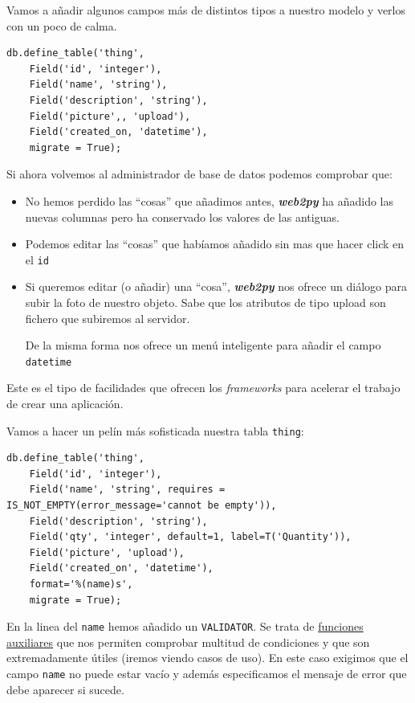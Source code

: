 \documentclass[
  12pt,
  spanish,
]{article}
\begin{document}
Vamos a añadir algunos campos más de distintos tipos a nuestro modelo y
verlos con un poco de calma.

\begin{verbatim}
db.define_table('thing',
    Field('id', 'integer'),
    Field('name', 'string'),
    Field('description', 'string'),
    Field('picture',, 'upload'),
    Field('created_on, 'datetime'),
    migrate = True);
\end{verbatim}

Si ahora volvemos al administrador de base de datos podemos comprobar
que:

\begin{itemize}
\item
  No hemos perdido las ``cosas'' que añadimos antes,
  \textbf{\emph{web2py}} ha añadido las nuevas columnas pero ha
  conservado los valores de las antiguas.
\item
  Podemos editar las ``cosas'' que habíamos añadido sin mas que hacer
  click en el \texttt{id}
\item
  Si queremos editar (o añadir) una ``cosa'', \textbf{\emph{web2py}} nos
  ofrece un diálogo para subir la foto de nuestro objeto. Sabe que los
  atributos de tipo upload son fichero que subiremos al servidor.

  De la misma forma nos ofrece un menú inteligente para añadir el campo
  \texttt{datetime}
\end{itemize}

Este es el tipo de facilidades que ofrecen los \emph{frameworks} para
acelerar el trabajo de crear una aplicación.

Vamos a hacer un pelín más sofisticada nuestra tabla \texttt{thing}:

\begin{verbatim}
db.define_table('thing',
    Field('id', 'integer'),
    Field('name', 'string', requires = IS_NOT_EMPTY(error_message='cannot be empty')),
    Field('description', 'string'),
    Field('qty', 'integer', default=1, label=T('Quantity')),
    Field('picture', 'upload'),
    Field('created_on', 'datetime'),
    format='%(name)s',
    migrate = True);
\end{verbatim}

En la linea del \texttt{name} hemos añadido un \texttt{VALIDATOR}. Se
trata de
\href{http://web2py.com/books/default/chapter/29/07/forms-and-validators}{funciones
auxiliares} que nos permiten comprobar multitud de condiciones y que son
extremadamente útiles (iremos viendo casos de uso). En este caso
exigimos que el campo \texttt{name} no puede estar vacío y además
especificamos el mensaje de error que debe aparecer si sucede.
\end{document}
